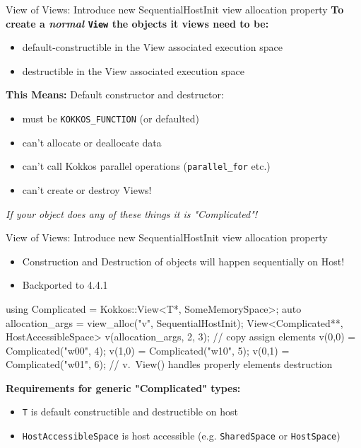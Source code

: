 \begin{frame}[fragile]{View of Views: Introduce new SequentialHostInit view allocation property}
\textbf{To create a \textit{normal} \texttt{View} the objects it views need to be:}
\begin{itemize}
  \item default-constructible in the View associated execution space
  \item destructible in the View associated execution space 
\end{itemize}

\vspace{10pt}

\textbf{This Means:} Default constructor and destructor:
\begin{itemize}
\item{must be \texttt{KOKKOS\_FUNCTION} (or defaulted)}
\item{can't allocate or deallocate data}
\item{can't call Kokkos parallel operations (\texttt{parallel\_for} etc.)}
\item{can't create or destroy Views!}
\end{itemize}

\vspace{10pt}
\begin{center}
\textit{If your object does any of these things it is "Complicated"!}
\end{center}

\end{frame}


\begin{frame}[fragile]{View of Views: Introduce new SequentialHostInit view allocation property}

\begin{itemize}
\item Construction and Destruction of objects will happen sequentially on Host!
\item Backported to 4.4.1
\end{itemize}

\begin{code}
using Complicated = Kokkos::View<T*, SomeMemorySpace>;
auto allocation_args = view_alloc("v", SequentialHostInit);
View<Complicated**, HostAccessibleSpace> v(allocation_args, 2, 3);
// copy assign elements
v(0,0) = Complicated("w00", 4);
v(1,0) = Complicated("w10", 5);
v(0,1) = Complicated("w01", 6);
// v.~View() handles properly elements destruction
\end{code}

\vspace{10pt}
\textbf{Requirements for generic "Complicated" types:}
\begin{itemize}
\item \texttt{T} is default constructible and destructible on host
\item \texttt{HostAccessibleSpace} is host accessible (e.g. \texttt{SharedSpace} or \texttt{HostSpace})
\end{itemize}
\end{frame}

